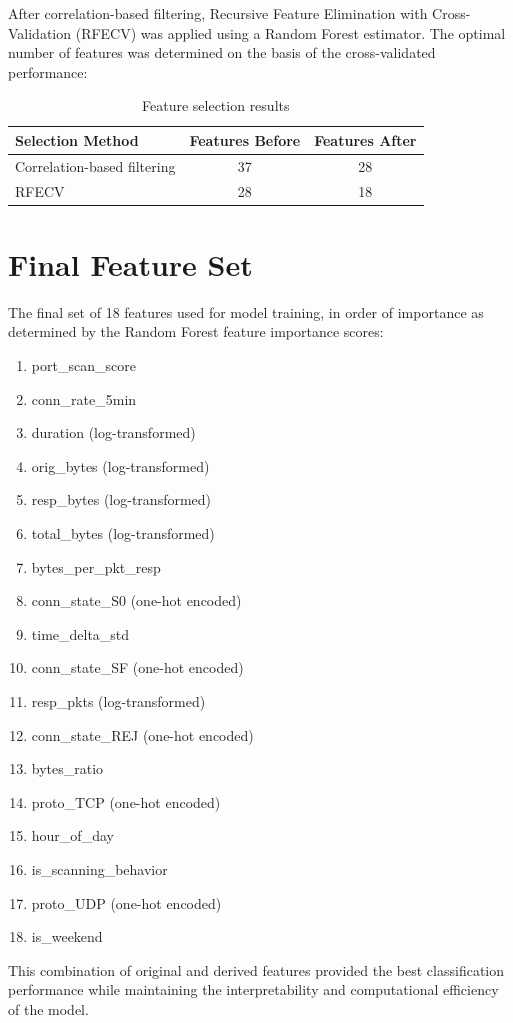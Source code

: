After correlation-based filtering, Recursive Feature Elimination with Cross-Validation (RFECV) was applied using a Random Forest estimator. The optimal number of features was determined on the basis of the cross-validated performance:

\begin{table}[h]
\centering
\caption{Feature selection results}
\label{tab:feature_selection}
\begin{tabular}{lcc}
\hline
\textbf{Selection Method} & \textbf{Features Before} & \textbf{Features After} \\
\hline
Correlation-based filtering & 37 & 28 \\
RFECV & 28 & 18 \\
\hline
\end{tabular}
\end{table}

\section{Final Feature Set}

The final set of 18 features used for model training, in order of importance as determined by the Random Forest feature importance scores:

\begin{enumerate}
    \item port\_scan\_score
    \item conn\_rate\_5min
    \item duration (log-transformed)
    \item orig\_bytes (log-transformed)
    \item resp\_bytes (log-transformed)
    \item total\_bytes (log-transformed)
    \item bytes\_per\_pkt\_resp
    \item conn\_state\_S0 (one-hot encoded)
    \item time\_delta\_std
    \item conn\_state\_SF (one-hot encoded)
    \item resp\_pkts (log-transformed)
    \item conn\_state\_REJ (one-hot encoded)
    \item bytes\_ratio
    \item proto\_TCP (one-hot encoded)
    \item hour\_of\_day
    \item is\_scanning\_behavior
    \item proto\_UDP (one-hot encoded)
    \item is\_weekend
\end{enumerate}

This combination of original and derived features provided the best classification performance while maintaining the interpretability and computational efficiency of the model. 

